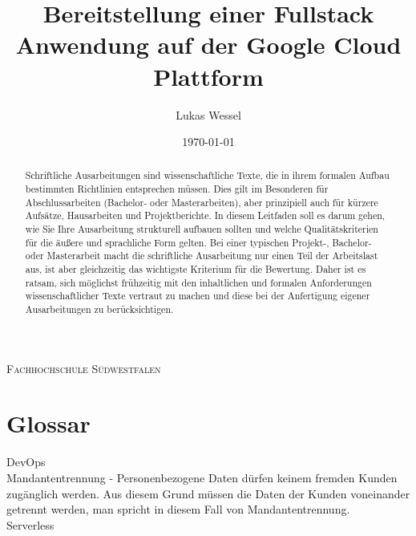 \documentclass[pdftex,a4paper,abstracton,11pt,parskip=half,bibtotocnumbered]{scrartcl}
\title{Bereitstellung einer Fullstack Anwendung auf der Google Cloud Plattform}
\author{Lukas Wessel}
\date{\today}
\begin{document}
\makeatletter
\begin{titlepage}
	\centering
	{\scshape\LARGE Fachhochschule Südwestfalen \par}
	\vspace{1cm}
	\vspace{1.5cm}
	{\huge\bfseries \@title\par}
	\vspace{3cm}
	{\Large \@author\par}
	\vspace{1cm}
	{\Large \@date\par}
	\vfill

	\raggedright
\end{titlepage}
\makeatother

\thispagestyle{empty}
\begin{abstract}
Schriftliche Ausarbeitungen sind wissenschaftliche Texte, die in ihrem formalen Aufbau bestimmten Richtlinien entsprechen müssen.
Dies gilt im Besonderen für Abschlussarbeiten (Bachelor- oder Masterarbeiten), aber prinzipiell auch für kürzere Aufsätze, Hausarbeiten und Projektberichte.
In diesem Leitfaden soll es darum gehen, wie Sie Ihre Ausarbeitung strukturell aufbauen sollten und welche Qualitätskriterien für die äußere und sprachliche Form gelten.
Bei einer typischen Projekt-, Bachelor- oder Masterarbeit macht die schriftliche Ausarbeitung nur einen Teil der Arbeitslast aus, ist aber gleichzeitig das wichtigste Kriterium für die Bewertung.
Daher ist es ratsam, sich möglichst frühzeitig mit den inhaltlichen und formalen Anforderungen wissenschaftlicher Texte vertraut zu machen und diese bei der Anfertigung eigener Ausarbeitungen zu berücksichtigen.
\end{abstract}

\vfill
\tableofcontents
\pagebreak

\setcounter{page}{1}

\section{Glossar}
DevOps \\
Mandantentrennung - Personenbezogene Daten dürfen keinem fremden Kunden zugänglich werden. Aus diesem Grund müssen die Daten der Kunden voneinander getrennt werden, 
man spricht in diesem Fall von Mandantentrennung.\\
Serverless
\end{document}
